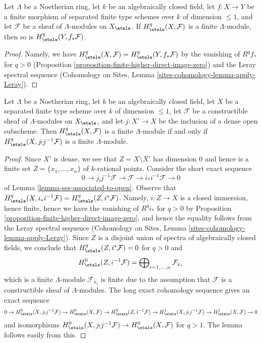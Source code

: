 \begin{lemma}
\label{lemma-finite-pushforward-coefficients}
Let $\Lambda$ be a Noetherian ring, let $k$ be an algebraically closed field,
let $f : X \to Y$ be a finite morphism of separated finite type schemes
over $k$ of dimension $\leq 1$, and let $\mathcal{F}$ be a sheaf
of $\Lambda$-modules on $X_\etale$. If
$H^q_\etale(X, \mathcal{F})$ is a finite $\Lambda$-module, then
so is $H^q_\etale(Y, f_*\mathcal{F})$.
\end{lemma}

\begin{proof}
Namely, we have $H^q_\etale(X, \mathcal{F}) = H^q_\etale(Y, f_*\mathcal{F})$
by the vanishing of $R^qf_*$ for $q > 0$
(Proposition \ref{proposition-finite-higher-direct-image-zero}) and
the Leray spectral sequence
(Cohomology on Sites, Lemma \ref{sites-cohomology-lemma-apply-Leray}).
\end{proof}

\begin{lemma}
\label{lemma-restrict-to-open-coefficients}
Let $\Lambda$ be a Noetherian ring, let $k$ be an algebraically closed field,
let $X$ be a separated finite type scheme over $k$ of dimension $\leq 1$,
let $\mathcal{F}$ be a constructible sheaf of $\Lambda$-modules on $X_\etale$,
and let $j : X' \to X$ be the inclusion of a dense open subscheme. Then
$H^q_\etale(X, \mathcal{F})$ is a finite $\Lambda$-module if and only if
$H^q_\etale(X, j_!j^{-1}\mathcal{F})$ is a finite $\Lambda$-module.
\end{lemma}

\begin{proof}
Since $X'$ is dense, we see that $Z = X \setminus X'$ has dimension $0$
and hence is a finite set $Z = \{x_1, \ldots, x_n\}$ of $k$-rational points.
Consider the short exact sequence
$$
0 \to j_!j^{-1}\mathcal{F} \to \mathcal{F} \to i_*i^{-1}\mathcal{F} \to 0
$$
of Lemma \ref{lemma-ses-associated-to-open}. Observe that
$H^q_\etale(X, i_*i^{-1}\mathcal{F}) = H^q_\etale(Z, i^*\mathcal{F})$.
Namely, $i : Z \to X$ is a closed immersion, hence finite,
hence we have the vanishing of $R^qi_*$ for $q > 0$ by
Proposition \ref{proposition-finite-higher-direct-image-zero}, and
hence the equality follows from the Leray spectral sequence
(Cohomology on Sites, Lemma \ref{sites-cohomology-lemma-apply-Leray}).
Since $Z$ is a disjoint union of spectra of algebraically closed
fields, we conclude that $H^q_\etale(Z, i^*\mathcal{F}) = 0$
for $q > 0$ and
$$
H^0_\etale(Z, i^{-1}\mathcal{F}) =
\bigoplus\nolimits_{i = 1, \ldots, n} \mathcal{F}_{x_i}
$$
which is a finite $\Lambda$-module $\mathcal{F}_{x_i}$ is finite due to the
assumption that $\mathcal{F}$ is a constructible sheaf of $\Lambda$-modules.
The long exact cohomology sequence gives an exact sequence
$$
0 \to
H^0_\etale(X, j_!j^{-1}\mathcal{F}) \to
H^0_\etale(X, \mathcal{F}) \to
H^0_\etale(Z, i^{-1}\mathcal{F}) \to
H^1_\etale(X, j_!j^{-1}\mathcal{F}) \to
H^1_\etale(X, \mathcal{F}) \to 0
$$
and isomorphisms $H^0_\etale(X, j_!j^{-1}\mathcal{F}) \to
H^0_\etale(X, \mathcal{F})$ for $q > 1$. The lemma follows easily from this.
\end{proof}

